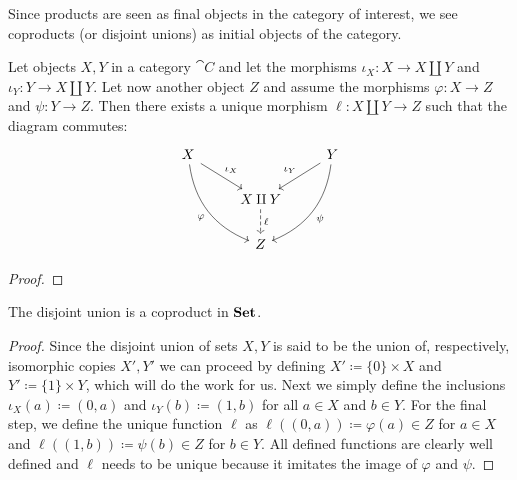 Since products are seen as final objects in the category of interest, we see
coproducts (or disjoint unions) as initial objects of the category.

\begin{proposition}
Let objects \(X, Y\) in a category \(\cat C\) and let the morphisms
\(\iota_X : X \to X \amalg Y\) and \(\iota_Y : Y \to X \amalg Y\). Let now
another object \(Z\) and assume the morphisms \(\varphi : X \to Z\) and
\(\psi : Y \to Z\). Then there exists a unique morphism \(\ell : X \amalg Y
\to Z\) such that the diagram commutes:
\[
  \begin{tikzcd}
    X
    \ar[ddr, bend right, swap,  "\varphi"]
    \ar[dr, "\iota_X"]
      &
        &Y
        \ar[dl, swap, "\iota_Y"]
        \ar[ddl, bend left, "\psi"]
        \\
      &X \amalg Y
      \ar[d, dashed, "\ell"]
        &\\
      &Z
  \end{tikzcd}
\]
\end{proposition}

\begin{proof}
\end{proof}

\begin{proposition}
The disjoint union is a coproduct in \({\textbf{Set}}\).
\end{proposition}

\begin{proof}
Since the disjoint union of sets \(X, Y\) is said to be the union of,
respectively, isomorphic copies \(X', Y'\) we can proceed by defining \(X'
\coloneq \{0\} \times X\) and \(Y' \coloneq \{1\} \times Y\), which will do the
work for us. Next we simply define the inclusions \(\iota_X(a) \coloneq (0, a)\)
and \(\iota_Y(b) \coloneq (1, b)\) for all \(a \in X\) and \(b \in Y\). For the
final step, we define the unique function \(\ell\) as \(\ell((0,a)) \coloneq
\varphi(a) \in Z\) for \(a \in X\) and \(\ell((1, b)) \coloneq \psi(b) \in Z\)
for \(b \in Y\). All defined functions are clearly well defined and \(\ell\)
needs to be unique because it imitates the image of \(\varphi\) and \(\psi\).
\end{proof}

